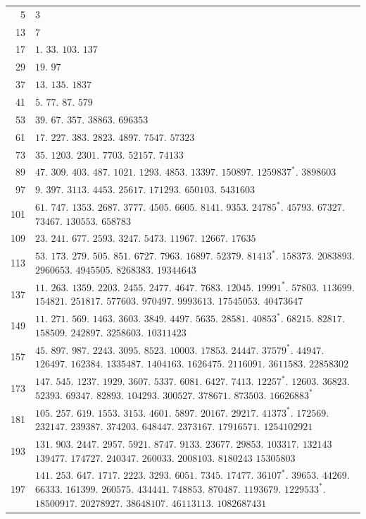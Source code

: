 \begin{longtable}{@{}r|p{\dimexpr\linewidth-38pt\relax}@{}}
5 & $3$\\
13 & $7$\\
17 & $1$. $33$. $103$. $137$\\
29 & $19$. $97$\\
37 & $13$. $135$. $1837$\\
41 & $5$. $77$. $87$. $579$\\
53 & $39$. $67$. $357$. $38863$. $696353$\\
61 & $17$. $227$. $383$. $2823$. $4897$. $7547$. $57323$\\
73 & $35$. $1203$. $2301$. $7703$. $52157$. $74133$\\
89 & $47$. $309$. $403$. $487$. $1021$. $1293$. $4853$. $13397$. $150897$. $1259837^{*}$. $3898603$\\
97 & $9$. $397$. $3113$. $4453$. $25617$. $171293$. $650103$. $5431603$\\
101 & $61$. $747$. $1353$. $2687$. $3777$. $4505$. $6605$. $8141$. $9353$. $24785^{*}$. $45793$. $67327$. $73467$. $130553$. $658783$\\
109 & $23$. $241$. $677$. $2593$. $3247$. $5473$. $11967$. $12667$. $17635$\\
113 & $53$. $173$. $279$. $505$. $851$. $6727$. $7963$. $16897$. $52379$. $81413^{*}$. $158373$. $2083893$. $2960653$. $4945505$. $8268383$. $19344643$\\
137 & $11$. $263$. $1359$. $2203$. $2455$. $2477$. $4647$. $7683$. $12045$. $19991^{*}$. $57803$. $113699$. $154821$. $251817$. $577603$. $970497$. $9993613$. $17545053$. $40473647$\\
149 & $11$. $271$. $569$. $1463$. $3603$. $3849$. $4497$. $5635$. $28581$. $40853^{*}$. $68215$. $82817$. $158509$. $242897$. $3258603$. $10311423$\\
157 & $45$. $897$. $987$. $2243$. $3095$. $8523$. $10003$. $17853$. $24447$. $37579^{*}$. $44947$. $126497$. $162384$. $1335487$. $1404163$. $1626475$. $2116091$. $3611583$. $22858302$\\
173 & $147$. $545$. $1237$. $1929$. $3607$. $5337$. $6081$. $6427$. $7413$. $12257^{*}$. $12603$. $36823$. $52393$. $69347$. $82893$. $104293$. $300527$. $378671$. $873503$. $16626883^{*}$\\
181 & $105$. $257$. $619$. $1553$. $3153$. $4601$. $5897$. $20167$. $29217$. $41373^{*}$. $172569$. $232147$. $239387$. $374203$. $648447$. $2373167$. $17916571$. $1254102921$\\
193 & $131$. $903$. $2447$. $2957$. $5921$. $8747$. $9133$. $23677$. $29853$. $103317$. $132143$ $139477$. $174727$. $240347$. $260033$. $2008103$. $8180243$ $15305803$\\
197 & $141$. $253$. $647$. $1717$. $2223$. $3293$. $6051$. $7345$. $17477$. $36107^{*}$. $39653$. $44269$. $66333$. $161399$. $260575$. $434441$. $748853$. $870487$. $1193679$. $1229533^{*}$. $18500917$. $20278927$. $38648107$. $46113113$. $1082687431$\\
\end{longtable}\endgroup
